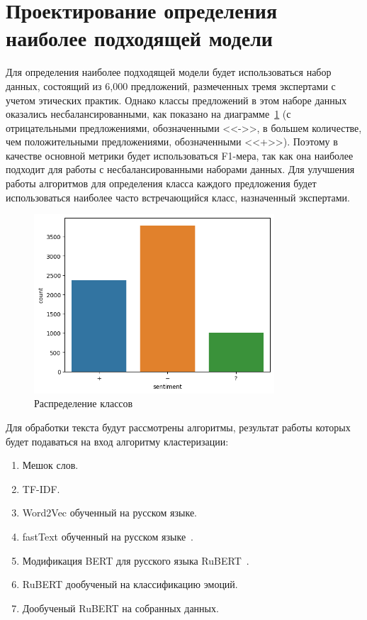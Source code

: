 \documentclass[PI, VKR]{HSEUniversity}
\begin{document}
\section{Проектирование определения наиболее подходящей модели}
\label{sec:org3d4e918}
Для определения наиболее подходящей модели будет использоваться набор данных, состоящий из 6,000 предложений, размеченных тремя экспертами с учетом этических практик. Однако классы предложений в этом наборе данных оказались несбалансированными, как показано на диаграмме~\ref{fig:class_balance} (с отрицательными предложениями, обозначенными {}<<->>{}, в большем количестве, чем положительными предложениями, обозначенными {}<<+>>{}). Поэтому в качестве основной метрики будет использоваться F1-мера, так как она наиболее подходит для работы с несбалансированными наборами данных. Для улучшения работы алгоритмов для определения класса каждого предложения будет использоваться наиболее часто встречающийся класс, назначенный экспертами.

\begin{figure}[h!]
\centering
\includegraphics[width=0.8\textwidth]{img/class_balance.png}
\caption{\label{fig:class_balance}Распределение классов}
\end{figure}

Для обработки текста будут рассмотрены алгоритмы, результат работы которых будет подаваться на вход алгоритму кластеризации:
\begin{enumerate}
\item Мешок слов.
\item TF-IDF.
\item Word2Vec обученный на русском языке.
\item fastText обученный на русском языке~\autocite{korogodina_evaluation_2020}.
\item Модификация BERT для русского языка RuBERT~\autocite{kuratov_adaptation_2019}.
\item RuBERT дообученый на классификацию эмоций.
\item Дообученый RuBERT на собранных данных.
\end{enumerate}
\end{document}
